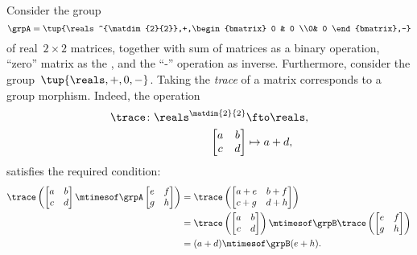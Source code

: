 \begin{example}
    Consider the group
    \begin{equation}
        \grpA=\tup{\reals^{\matdim{2}{2}},+,\begin{bmatrix}
                0 & 0 \\0& 0
            \end{bmatrix},-}
    \end{equation}
    of real~$2\times 2$ matrices, together with sum of matrices as a binary operation, ``zero'' matrix as the , and the ``-'' operation as inverse.
    Furthermore, consider the group~$\tup{\reals,+,0,-}$.
    Taking the \emph{trace} of a matrix corresponds to a group morphism.
    Indeed, the operation
    \begin{equation}
        \begin{aligned}
            \trace\colon \reals^{\matdim{2}{2}} & \fto \reals, \\
            \begin{bmatrix}
                a & b \\
                c & d
            \end{bmatrix}                     & \mapsto a+d,
        \end{aligned}
    \end{equation}
    satisfies the required condition:
    \begin{equation}
        \begin{aligned}
            \trace \left(
            \begin{bmatrix}
                a & b \\
                c & d
            \end{bmatrix} \mtimesof\grpA
            \begin{bmatrix}
                e & f \\
                g & h
            \end{bmatrix}
            \right) & =
            \trace
            \left(
            \begin{bmatrix}
                a+e & b+f \\
                c+g & d+h
            \end{bmatrix}
            \right) \\
                    & =\trace \left(
            \begin{bmatrix}
                a & b \\
                c & d
            \end{bmatrix}\right)\mtimesof\grpB \trace \left(
            \begin{bmatrix}
                e & f \\
                g & h
            \end{bmatrix}
            \right) \\
                    & =(a+d)\mtimesof\grpB (e+h).
        \end{aligned}
    \end{equation}
\end{example}

